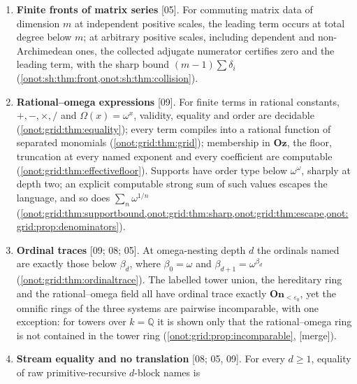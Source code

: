 \documentclass[11pt,oneside]{article}
\numberwithin{equation}{section}
\theoremstyle{definition}
\theoremstyle{remark}
\newcommand{\Oz}{\mathbf{Oz}}
\newcommand{\On}{\mathbf{On}}
\newcommand{\Q}{\mathbb Q}
\newcommand{\R}{\mathbb R}
\newcommand{\Ralg}{\R_{\mathrm{alg}}}
\newcommand{\Dd}{\mathcal D}
\newcommand{\FH}{\operatorname{Frac}(\mathcal H)}
\newcommand{\SE}{\mathcal S_{\varepsilon_0}}
\newcommand{\Om}{\Omega}
\newcommand{\src}[1]{\textup{\textsf{\small[#1]}}}
\newcommand{\mergetag}{\textup{\textsf{\small[merge]}}}
\begin{document}
\begin{enumerate}[label=\textup{(\arabic*)},leftmargin=*,itemsep=3pt]
\src{05}. Finite hereditary forms over $k=\Q$ or $\Ralg$ have canonical trees,
decidable order and omnific membership, and a computable floor; their ordinals
are exactly those below $\varepsilon_0$, with natural arithmetic
(\cref{onot:sh:thm:hereditary,onot:sh:thm:floor,onot:sh:thm:ordinalfragment}).
The shielded ring $\SE=\Dd+\varepsilon_0\FH[\varepsilon_0]$ has decidable
validity, equality and order and contains infinite normal forms, including
supports of type $\omega^r$ for every $r$
(\cref{onot:sh:thm:epsilon,onot:sh:cor:omegar}); $\FH$ is not real closed
(\cref{onot:sh:prop:notrealclosed}).
\item \textbf{Finite fronts of matrix series} \src{05}. For commuting matrix
data of dimension $m$ at independent positive scales, the leading term occurs
at total degree below $m$; at arbitrary positive scales, including dependent and
non-Archimedean ones, the collected adjugate numerator certifies zero and the
leading term, with the sharp bound $(m-1)\sum\delta_i$
(\cref{onot:sh:thm:front,onot:sh:thm:collision}).
\item \textbf{Rational--omega expressions} \src{09}. For finite terms in
rational constants, $+,-,\times,/$ and $\Om(x)=\omega^x$, validity, equality and
order are decidable (\cref{onot:grid:thm:equality}); every term compiles into a
rational function of separated monomials (\cref{onot:grid:thm:grid}); membership
in $\Oz$, the floor, truncation at every named exponent and every coefficient
are computable (\cref{onot:grid:thm:effectivefloor}). Supports have order type
below $\omega^\omega$, sharply at depth two; an explicit computable strong sum
of such values escapes the language, and so does $\sum_n\omega^{1/n}$
(\cref{onot:grid:thm:supportbound,onot:grid:thm:sharp,onot:grid:thm:escape,onot:grid:prop:denominators}).
\item \textbf{Ordinal traces} \src{09; 08; 05}. At omega-nesting depth $d$ the
ordinals named are exactly those below $\beta_d$, where $\beta_0=\omega$ and
$\beta_{d+1}=\omega^{\beta_d}$ (\cref{onot:grid:thm:ordinaltrace}). The labelled
tower union, the hereditary ring and the rational--omega field all have ordinal
trace exactly $\On_{<\varepsilon_0}$, yet the omnific rings of the three systems
are pairwise incomparable, with one exception: for towers over $k=\Q$ it
is shown only that the rational--omega ring is not contained in the tower ring
(\cref{onot:grid:prop:incomparable}, \mergetag).
\item \textbf{Stream equality and no translation} \src{08; 05, 09}. For every
$d\ge1$, equality of raw primitive-recursive $d$-block names is

\end{enumerate}
\end{document}
